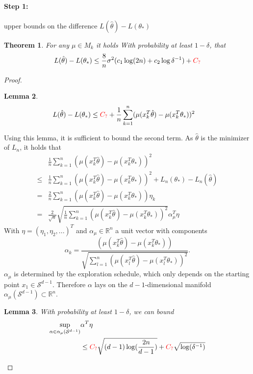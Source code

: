 \documentclass[twoside]{article} \usepackage{aistats2017}
\newtheorem{theorem}{Theorem}
\newtheorem{lemma}[theorem]{Lemma}
\newcommand{\uc}{
\color{red}C_?\color{black}
}
\begin{document}
\paragraph{Step 1: } upper bounds on the difference $L(\hat{\theta})-L(\theta_*)$
\begin{theorem}
    For any $\mu\in M_k$ it holds With probability at least $1-\delta$, that 
    $$
    L(\hat{\theta})-L(\theta_*)\leq \frac{8}{n}\sigma^2(c_1\log(2n)+c_2\log{\delta^{-1}})+\uc
    $$
\end{theorem}
\begin{proof}
\begin{lemma}\label{intapprox}
\begin{align*}
&L(\hat{\theta})-L(\theta_*) \leq\uc + \frac{1}{n}\sum_{k=1}^n(\mu(x_k^T\hat{\theta})-\mu(x_k^T\theta_*))^2
\end{align*}
\end{lemma}
Using this lemma, it is sufficient to bound the second term.
As $\hat{\theta}$ is the minimizer of $L_n$, it holds that
    \begin{align*}
        &\frac{1}{n}\sum_{k=1}^n(\mu(x_k^T\hat{\theta})-\mu(x_k^T\theta_*))^2 \\
        \leq &\frac{1}{n}\sum_{k=1}^n(\mu(x_k^T\hat{\theta})-\mu(x_k^T\theta_*))^2 + L_n(\theta_*)-L_n(\hat{\theta})\\
        = &\frac{2}{n}\sum_{k=1}^n(\mu(x_k^T\hat{\theta})-\mu(x_k^T\theta_*))\eta_k\\
        = &\frac{2}{\sqrt{n}}\sqrt{\frac{1}{n}\sum_{k=1}^n(\mu(x_k^T\hat{\theta})-\mu(x_k^T\theta_*))^2}\alpha_\mu^T\eta
\end{align*}
With $\eta=(\eta_1,\eta_2,...)^T$ and $\alpha_\mu\in\mathbb{R}^n$ a unit vector with components
$$\alpha_k = \frac{(\mu(x_k^T\hat{\theta})-\mu(x_k^T\theta_*))}{\sqrt{\sum_{l=1}^n(\mu(x_l^T\hat{\theta})-\mu(x_l^T\theta_*))^2}}.$$
$\alpha_\mu$ is determined by the exploration schedule, which only depends on the starting point $x_1\in\mathcal{S}^{d-1}$. Therefore $\alpha$ lays on the $d-1$-dimensional manifold $\alpha_\mu(\mathcal{S}^{d-1})\subset \mathbb{R}^n$.
\begin{lemma}
    With probability at least $1-\delta$, we can bound
    \begin{align*}
    \sup_{\alpha\in\alpha_\mu(\mathcal{S}^{d-1})}&\alpha^T\eta\\
    &\leq \uc\sqrt{(d-1)\log(\frac{2n}{d-1})}+\uc\sqrt{\log(\delta^{-1})}
    \end{align*}
\end{lemma}

\end{proof}
\end{document}

